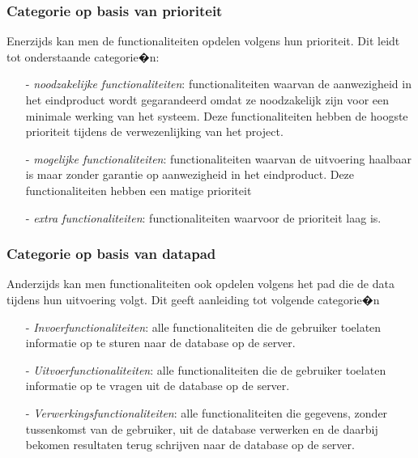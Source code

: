 \documentclass{article}
\begin{document}
\subsubsection{Categorie op basis van prioriteit}
Enerzijds kan men de functionaliteiten opdelen volgens hun prioriteit. Dit leidt tot onderstaande categorie�n:
\begin{itemize}	
\item[-] \textit{noodzakelijke functionaliteiten}: functionaliteiten waarvan de aanwezigheid in het eindproduct wordt gegarandeerd omdat ze noodzakelijk zijn voor een minimale werking van het systeem. Deze functionaliteiten hebben de hoogste prioriteit tijdens de verwezenlijking van het project. \\
\item[-] \textit{mogelijke functionaliteiten}: functionaliteiten waarvan de uitvoering haalbaar is maar zonder garantie op aanwezigheid in het eindproduct. Deze functionaliteiten hebben een matige prioriteit \\
\item[-] \textit{extra functionaliteiten}: functionaliteiten waarvoor de prioriteit laag is. \\
\end{itemize}

\subsubsection{Categorie op basis van datapad}
Anderzijds kan men functionaliteiten ook opdelen volgens het pad die de data tijdens hun uitvoering volgt. Dit geeft aanleiding tot volgende categorie�n

\begin{itemize}
\item[-] \textit{Invoerfunctionaliteiten}:  alle functionaliteiten die de gebruiker toelaten informatie op te sturen naar de database op de server. 
\item[-] \textit{Uitvoerfunctionaliteiten}: alle functionaliteiten die de gebruiker toelaten informatie op te vragen uit de database op de server.
\item[-] \textit{Verwerkingsfunctionaliteiten}: alle functionaliteiten die gegevens, zonder tussenkomst van de gebruiker, uit de database verwerken en de daarbij bekomen resultaten terug schrijven naar de database op de server.
\end{itemize}
\end{document}
